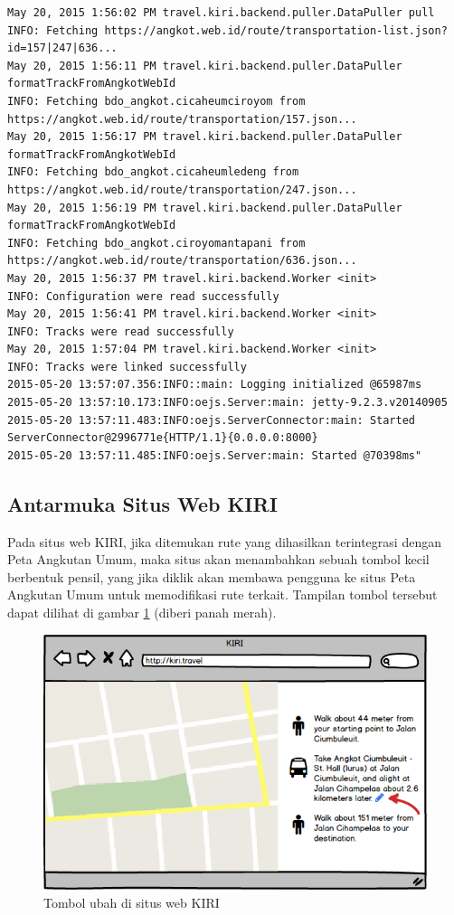 \begin{lstlisting}
May 20, 2015 1:56:02 PM travel.kiri.backend.puller.DataPuller pull
INFO: Fetching https://angkot.web.id/route/transportation-list.json?id=157|247|636...
May 20, 2015 1:56:11 PM travel.kiri.backend.puller.DataPuller formatTrackFromAngkotWebId
INFO: Fetching bdo_angkot.cicaheumciroyom from https://angkot.web.id/route/transportation/157.json...
May 20, 2015 1:56:17 PM travel.kiri.backend.puller.DataPuller formatTrackFromAngkotWebId
INFO: Fetching bdo_angkot.cicaheumledeng from https://angkot.web.id/route/transportation/247.json...
May 20, 2015 1:56:19 PM travel.kiri.backend.puller.DataPuller formatTrackFromAngkotWebId
INFO: Fetching bdo_angkot.ciroyomantapani from https://angkot.web.id/route/transportation/636.json...
May 20, 2015 1:56:37 PM travel.kiri.backend.Worker <init>
INFO: Configuration were read successfully
May 20, 2015 1:56:41 PM travel.kiri.backend.Worker <init>
INFO: Tracks were read successfully
May 20, 2015 1:57:04 PM travel.kiri.backend.Worker <init>
INFO: Tracks were linked successfully
2015-05-20 13:57:07.356:INFO::main: Logging initialized @65987ms
2015-05-20 13:57:10.173:INFO:oejs.Server:main: jetty-9.2.3.v20140905
2015-05-20 13:57:11.483:INFO:oejs.ServerConnector:main: Started ServerConnector@2996771e{HTTP/1.1}{0.0.0.0:8000}
2015-05-20 13:57:11.485:INFO:oejs.Server:main: Started @70398ms"
\end{lstlisting}


\subsection{Antarmuka Situs Web KIRI}

Pada situs web KIRI, jika ditemukan rute yang dihasilkan terintegrasi dengan Peta Angkutan Umum, maka situs akan menambahkan sebuah tombol kecil berbentuk pensil, yang jika diklik akan membawa pengguna ke situs Peta Angkutan Umum untuk memodifikasi rute terkait. Tampilan tombol tersebut dapat dilihat di gambar \ref{fig:4_tombolubah} (diberi panah merah).

\begin{figure}
	\centering
	\includegraphics[scale=0.5]{Gambar/4_tombolubah}
	\caption{Tombol ubah di situs web KIRI} 
	\label{fig:4_tombolubah}
\end{figure}